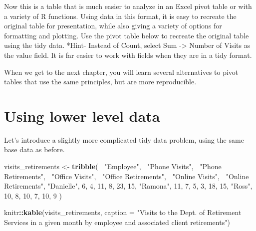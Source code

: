 \documentclass[]{book}
\newenvironment{Shaded}{\begin{snugshade}}{\end{snugshade}}
\newcommand{\KeywordTok}[1]{\textcolor[rgb]{0.13,0.29,0.53}{\textbf{#1}}}
\newcommand{\DataTypeTok}[1]{\textcolor[rgb]{0.13,0.29,0.53}{#1}}
\newcommand{\DecValTok}[1]{\textcolor[rgb]{0.00,0.00,0.81}{#1}}
\newcommand{\StringTok}[1]{\textcolor[rgb]{0.31,0.60,0.02}{#1}}
\newcommand{\OperatorTok}[1]{\textcolor[rgb]{0.81,0.36,0.00}{\textbf{#1}}}
\newcommand{\NormalTok}[1]{#1}
\begin{document}
Now this is a table that is much easier to analyze in an Excel pivot
table or with a variety of R functions. Using data in this format, it is
easy to recreate the original table for presentation, while also giving
a variety of options for formatting and plotting. Use the pivot table
below to recreate the original table using the tidy data. *Hint- Instead
of Count, select Sum -\textgreater{} Number of Visits as the value
field. It is far easier to work with fields when they are in a tidy
format.

\begin{Shaded}
\end{Shaded}

\hypertarget{htmlwidget-ac66875510613e4516b7}{}

When we get to the next chapter, you will learn several alternatives to
pivot tables that use the same principles, but are more reproducible.

\section{Using lower level data}\label{using-lower-level-data}

Let's introduce a slightly more complicated tidy data problem, using the
same base data as before.

\begin{Shaded}
\begin{Highlighting}[]
\NormalTok{visits_retirements <-}\StringTok{ }\KeywordTok{tribble}\NormalTok{(}
  \OperatorTok{~}\StringTok{"Employee"}\NormalTok{, }\OperatorTok{~}\StringTok{"Phone Visits"}\NormalTok{, }\OperatorTok{~}\StringTok{"Phone Retirements"}\NormalTok{, }\OperatorTok{~}\StringTok{"Office Visits"}\NormalTok{, }\OperatorTok{~}\StringTok{"Office Retirements"}\NormalTok{, }\OperatorTok{~}\StringTok{"Online Visits"}\NormalTok{, }\OperatorTok{~}\StringTok{"Online Retirements"}\NormalTok{,}
  \StringTok{"Danielle"}\NormalTok{, }\DecValTok{6}\NormalTok{, }\DecValTok{4}\NormalTok{, }\DecValTok{11}\NormalTok{, }\DecValTok{8}\NormalTok{, }\DecValTok{23}\NormalTok{, }\DecValTok{15}\NormalTok{,}
  \StringTok{"Ramona"}\NormalTok{, }\DecValTok{11}\NormalTok{, }\DecValTok{7}\NormalTok{, }\DecValTok{5}\NormalTok{, }\DecValTok{3}\NormalTok{, }\DecValTok{18}\NormalTok{, }\DecValTok{15}\NormalTok{,}
  \StringTok{"Ross"}\NormalTok{, }\DecValTok{10}\NormalTok{, }\DecValTok{8}\NormalTok{, }\DecValTok{10}\NormalTok{, }\DecValTok{7}\NormalTok{, }\DecValTok{10}\NormalTok{, }\DecValTok{9} 
\NormalTok{)}

\NormalTok{knitr}\OperatorTok{::}\KeywordTok{kable}\NormalTok{(visits_retirements, }\DataTypeTok{caption =} \StringTok{"Visits to the Dept. of Retirement Services in a given month by employee and associated client retirements"}\NormalTok{)}
\end{Highlighting}
\end{Shaded}
\end{document}
